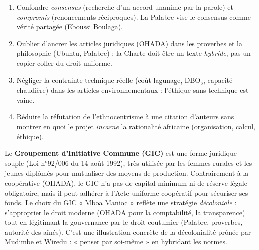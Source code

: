 \documentclass[11pt]{article}
\newcommand{\cle}[1]{{\popxbold\color{popdark}#1}}
\begin{document}
\begin{attention}
\begin{enumerate}
\item Confondre \emph{consensus} (recherche d'un accord unanime par la parole) et \emph{compromis} (renoncements réciproques). La Palabre vise le consensus comme vérité partagée (Eboussi Boulaga).
\item Oublier d'ancrer les articles juridiques (OHADA) dans les proverbes et la philosophie (Ubuntu, Palabre) : la Charte doit être un texte \emph{hybride}, pas un copier-coller du droit uniforme.
\item Négliger la contrainte technique réelle (coût lagunage, DBO$_5$, capacité chaudière) dans les articles environnementaux : l'éthique sans technique est vaine.
\item Réduire la réfutation de l'ethnocentrisme à une citation d'auteurs sans montrer en quoi le projet \emph{incarne} la rationalité africaine (organisation, calcul, éthique).
\end{enumerate}
\end{attention}

\begin{savaistu}
Le \textbf{Groupement d'Initiative Commune (GIC)} est une forme juridique souple (Loi n°92/006 du 14 août 1992), très utilisée par les femmes rurales et les jeunes diplômés pour mutualiser des moyens de production. Contrairement à la coopérative (OHADA), le GIC n'a pas de capital minimum ni de réserve légale obligatoire, mais il peut adhérer à l'Acte uniforme coopératif pour sécuriser ses fonds. Le choix du GIC « Mboa Manioc » reflète une stratégie \emph{décoloniale} : s'approprier le droit moderne (OHADA pour la comptabilité, la transparence) tout en légitimant la gouvernance par le droit coutumier (Palabre, proverbes, autorité des aînés). C'est une illustration concrète de la \cle{décolonialité} prônée par Mudimbe et Wiredu : « penser par soi-même » en hybridant les normes.
\end{savaistu}
\end{document}
